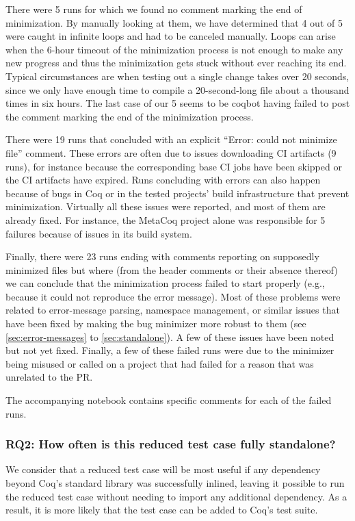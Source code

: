\documentclass[a4paper,USenglish,cleveref,autoref,thm-restate]{lipics-v2021}
\begin{document}
There were 5 runs for which we found no comment marking the end of minimization. By manually looking at them, we have determined that 4 out of 5 were caught in infinite loops and had to be canceled manually. Loops can arise when the 6-hour timeout of the minimization process is not enough to make any new progress and thus the minimization gets stuck without ever reaching its end. Typical circumstances are when testing out a single change takes over 20 seconds, since we only have enough time to compile a 20-second-long file about a thousand times in six hours. The last case of our 5 seems to be coqbot having failed to post the comment marking the end of the minimization process.

There were 19 runs that concluded with an explicit ``Error: could not minimize file'' comment. These errors are often due to issues downloading CI artifacts (9 runs), for instance because the corresponding base CI jobs have been skipped or the CI artifacts have expired. Runs concluding with errors can also happen because of bugs in Coq or in the tested projects' build infrastructure that prevent minimization. Virtually all these issues were reported, and most of them are already fixed. For instance, the MetaCoq project alone was responsible for 5 failures because of issues in its build system.

Finally, there were 23 runs ending with comments reporting on supposedly minimized files but where (from the header comments or their absence thereof) we can conclude that the minimization process failed to start properly (e.g., because it could not reproduce the error message). Most of these problems were related to error-message parsing, namespace management, or similar issues that have been fixed by making the bug minimizer more robust to them (see \autoref{sec:error-messages} to \autoref{sec:standalone}). A few of these issues have been noted but not yet fixed. Finally, a few of these failed runs were due to the minimizer being misused or called on a project that had failed for a reason that was unrelated to the PR.

The accompanying notebook contains specific comments for each of the failed runs.

\subsubsection{RQ2: How often is this reduced test case fully standalone?}

We consider that a reduced test case will be most useful if any dependency beyond Coq's standard library was successfully inlined, leaving it possible to run the reduced test case without needing to import any additional dependency. As a result, it is more likely that the test case can be added to Coq's test suite.
\end{document}
